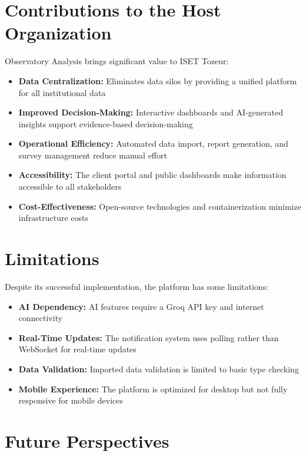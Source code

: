 \documentclass[12pt,a4paper]{report}
\begin{document}
\section*{Contributions to the Host Organization}

Observatory Analysis brings significant value to ISET Tozeur:
\begin{itemize}
    \item \textbf{Data Centralization:} Eliminates data silos by providing a unified platform for all institutional data
    \item \textbf{Improved Decision-Making:} Interactive dashboards and AI-generated insights support evidence-based decision-making
    \item \textbf{Operational Efficiency:} Automated data import, report generation, and survey management reduce manual effort
    \item \textbf{Accessibility:} The client portal and public dashboards make information accessible to all stakeholders
    \item \textbf{Cost-Effectiveness:} Open-source technologies and containerization minimize infrastructure costs
\end{itemize}

\section*{Limitations}

Despite its successful implementation, the platform has some limitations:
\begin{itemize}
    \item \textbf{AI Dependency:} AI features require a Groq API key and internet connectivity
    \item \textbf{Real-Time Updates:} The notification system uses polling rather than WebSocket for real-time updates
    \item \textbf{Data Validation:} Imported data validation is limited to basic type checking
    \item \textbf{Mobile Experience:} The platform is optimized for desktop but not fully responsive for mobile devices
\end{itemize}

\section*{Future Perspectives}
\end{document}
